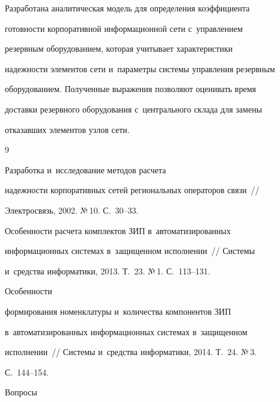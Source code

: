    


   Разработана аналитическая модель для определения коэффициента 


готовности корпоративной информационной сети с~управлением 


резервным оборудованием, которая учитывает характеристики 


надежности элементов сети и~параметры системы управления резервным 


оборудованием. Полученные выражения позволяют оценивать время 


доставки резервного оборудования с~центрального склада для замены 


отказавших элементов узлов сети.


   


{\small\frenchspacing


{%




\begin{thebibliography}{9}




 Разработка и~исследование методов расчета 


надежности корпоративных сетей региональных операторов связи~/\!\!/ 


Электросвязь, 2002. №\,10. С.~30--33.






Особенности расчета комплектов ЗИП в~автоматизированных 


информационных системах в~защищенном исполнении~/\!\!/ Системы 


и~средства информатики, 2013. Т.~23. №\,1. С.~113--131.




 Особенности 


формирования номенклатуры и~количества компонентов ЗИП 


в~автоматизированных информационных системах в~защищенном 


исполнении~/\!\!/ Системы и~средства информатики, 2014. Т.~24. №\,3. 


С.~144--154.




 Вопросы 



\end{thebibliography}}}
